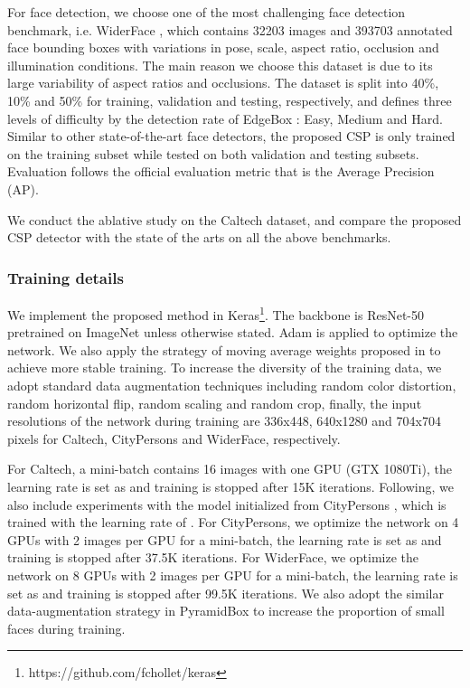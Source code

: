 For face detection, we choose one of the most challenging face detection benchmark, i.e. WiderFace \cite{yang2016wider}, which contains 32203 images and 393703 annotated face bounding boxes with variations in pose, scale, aspect ratio, occlusion and illumination conditions. The main reason we choose this dataset is due to its large variability of aspect ratios and occlusions. The dataset is split into 40\%, 10\% and 50\% for training, validation and testing, respectively, and defines three levels of difficulty by the detection rate of EdgeBox \cite{zitnick2014edge}: Easy, Medium and Hard. Similar to other state-of-the-art face detectors, the proposed CSP is only trained on the training subset while tested on both validation and testing subsets.
Evaluation follows the official evaluation metric that is the Average Precision (AP).

We conduct the ablative study on the Caltech dataset, and compare the proposed CSP detector with the state of the arts on all the above benchmarks.


\subsubsection{Training details}
We implement the proposed method in Keras\footnote{https://github.com/fchollet/keras}.
The backbone is ResNet-50 \cite{he2016deep} pretrained on ImageNet \cite{deng2009imagenet} unless otherwise stated. Adam \cite{kingma2014adam} is applied to optimize the network. We also apply the strategy of moving average weights proposed in \cite{tarvainen2017mean} to achieve more stable training.
To increase the diversity of the training data, we adopt standard data augmentation techniques including random color distortion, random horizontal flip, random scaling and random crop, finally, the input resolutions of the network during training are 336x448, 640x1280 and 704x704 pixels for Caltech, CityPersons and WiderFace, respectively.

For Caltech, a mini-batch contains 16 images with one GPU (GTX 1080Ti), the learning rate is set as  and training is stopped after 15K iterations. Following\cite{zhang2017citypersons,wang2017repulsion,Liu_2018_ECCV,Zhang_2018_ECCV}, we also include experiments with the model initialized from CityPersons \cite{zhang2017citypersons}, which is trained with the learning rate of .
For CityPersons, we optimize the network on 4 GPUs with 2 images per GPU for a mini-batch, the learning rate is set as  and training is stopped after 37.5K iterations.
For WiderFace, we optimize the network on 8 GPUs with 2 images per GPU for a mini-batch, the learning rate is set as  and training is stopped after 99.5K iterations. We also adopt the similar data-augmentation strategy in PyramidBox \cite{Tang_2018_ECCV} to increase the proportion of small faces during training.

